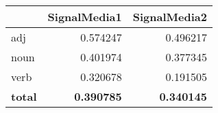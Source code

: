 \begin{tabular}{lrr}
\toprule
{} &  SignalMedia1 &  SignalMedia2 \\
\midrule
adj   &      0.574247 &      0.496217 \\
noun  &      0.401974 &      0.377345 \\
verb  &      0.320678 &      0.191505 \\
\textbf{total} &      \textbf{0.390785} &      \textbf{0.340145} \\
\bottomrule
\end{tabular}
